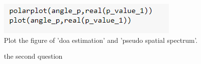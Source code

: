 \documentclass{report}
\begin{document}
\newpage
\begin{figure}
\includegraphics[scale=0.7]{code plot doa and spectrum}
\\Plot the figure of 'doa estimation' and 'pseudo spatial spectrum'.
\end{figure}

\begin{figure}[htbp]
 
\caption{the second question} %
\label{fig:1}  %
\end{figure}
\end{document}
